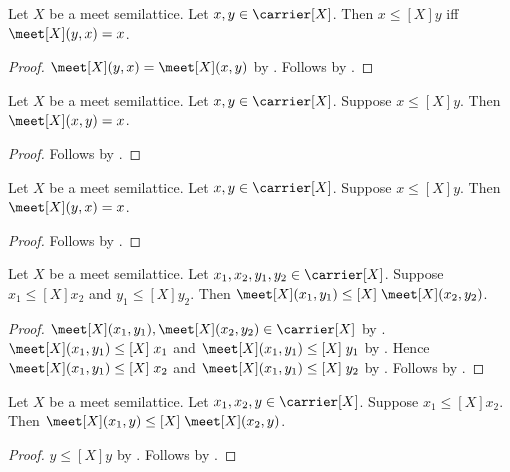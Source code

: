 \begin{proposition}\label{leq_iff_meet_eq_right}
    Let $X$ be a meet semilattice.
    Let $x,y\in\carrier[X]$.
    Then $x\mathrel{\leq[X]}y$ iff $\meet[X](y,x)=x$.
\end{proposition}
\begin{proof}
    $\meet[X](y,x)=\meet[X](x,y)$ by .
    Follows by .
\end{proof}

\begin{proposition}\label{meet_eq_left_of_leq}
    Let $X$ be a meet semilattice.
    Let $x,y\in\carrier[X]$.
    Suppose $x\mathrel{\leq[X]}y$.
    Then $\meet[X](x,y)=x$.
\end{proposition}
\begin{proof}
    Follows by .
\end{proof}

\begin{proposition}\label{meet_eq_right_of_leq}
    Let $X$ be a meet semilattice.
    Let $x,y\in\carrier[X]$.
    Suppose $x\mathrel{\leq[X]}y$.
    Then $\meet[X](y,x)=x$.
\end{proposition}
\begin{proof}
    Follows by .
\end{proof}

\begin{proposition}\label{meet_monotone}
    Let $X$ be a meet semilattice.
    Let $x_1,x_2,y_1,y_2\in\carrier[X]$.
    Suppose $x_1\mathrel{\leq[X]}x_2$ and
        $y_1\mathrel{\leq[X]}y_2$.
    Then $\meet[X](x_1,y_1)\mathrel{\leq[X]}\meet[X](x_2,y_2)$.
\end{proposition}
\begin{proof}
    $\meet[X](x_1,y_1),\meet[X](x_2,y_2)\in\carrier[X]$ by
        .
    $\meet[X](x_1,y_1)\mathrel{\leq[X]}x_1$ and
        $\meet[X](x_1,y_1)\mathrel{\leq[X]}y_1$ by .
    Hence $\meet[X](x_1,y_1)\mathrel{\leq[X]}x_2$ and
        $\meet[X](x_1,y_1)\mathrel{\leq[X]}y_2$ by
        .
    Follows by .
\end{proof}

\begin{proposition}\label{meet_monotone_left}
    Let $X$ be a meet semilattice.
    Let $x_1,x_2,y\in\carrier[X]$.
    Suppose $x_1\mathrel{\leq[X]}x_2$.
    Then $\meet[X](x_1,y)\mathrel{\leq[X]}\meet[X](x_2,y)$.
\end{proposition}
\begin{proof}
    $y\mathrel{\leq[X]}y$ by
        .
    Follows by .
\end{proof}

